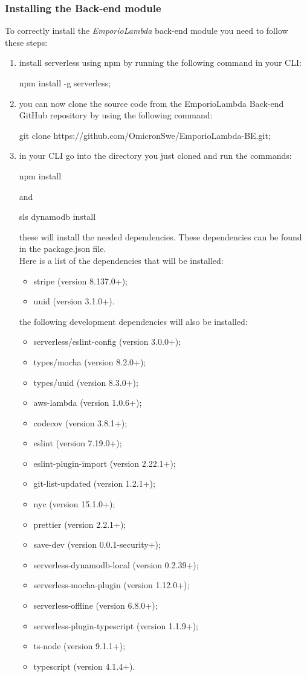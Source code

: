 \subsubsection{Installing the Back-end module}
To correctly install the \textit{EmporioLambda} back-end module you need to follow these steps:
\begin{enumerate}
\item install serverless using npm by running the following command in your CLI:\begin{center}
npm install -g serverless;
\end{center}
\item you can now clone the source code from the EmporioLambda Back-end GitHub repository by using the following command:
\begin{center}
git clone https://github.com/OmicronSwe/EmporioLambda-BE.git;
\end{center}
\item in your CLI go into the directory you just cloned and run the commands:
\begin{center}
npm install
\end{center}
and
\begin{center}
sls dynamodb install
\end{center}
these will install the needed dependencies. These dependencies can be found in the package.json file.\\Here is a list of the dependencies that will be installed:
\begin{itemize}
\item stripe (version 8.137.0+);
\item uuid (version 3.1.0+).
\end{itemize}
the following development dependencies will also be installed:
\begin{itemize}
\item serverless/eslint-config (version 3.0.0+);
\item types/mocha (version 8.2.0+);
\item types/uuid (version 8.3.0+);
\item aws-lambda (version 1.0.6+);
\item codecov (version 3.8.1+);
\item eslint (version 7.19.0+);
\item eslint-plugin-import (version 2.22.1+);
\item git-list-updated (version 1.2.1+);
\item nyc (version 15.1.0+);
\item prettier (version 2.2.1+);
\item save-dev (version 0.0.1-security+);
\item serverless-dynamodb-local (version 0.2.39+);
\item serverless-mocha-plugin (version 1.12.0+);
\item serverless-offline (version 6.8.0+);
\item serverless-plugin-typescript (version 1.1.9+);
\item ts-node (version 9.1.1+);
\item typescript (version 4.1.4+).
\end{itemize}
\end{enumerate}